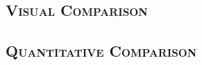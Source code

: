 \subsection{\textsc{Visual Comparison}}
\vspace*{-10pt}

\subsection{\textsc{Quantitative Comparison}}
\vspace*{-10pt}